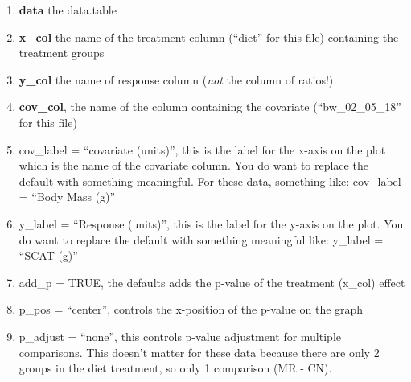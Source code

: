\documentclass[]{book}
\providecommand{\tightlist}{%
  \setlength{\itemsep}{0pt}\setlength{\parskip}{0pt}}
\begin{document}
\begin{enumerate}
\def\labelenumi{\arabic{enumi}.}
\tightlist
\item
  \textbf{data} the data.table
\item
  \textbf{x\_col} the name of the treatment column (``diet'' for this file) containing the treatment groups
\item
  \textbf{y\_col} the name of response column (\emph{not} the column of ratios!)
\item
  \textbf{cov\_col}, the name of the column containing the covariate (``bw\_02\_05\_18'' for this file)
\item
  cov\_label = ``covariate (units)'', this is the label for the x-axis on the plot which is the name of the covariate column. You do want to replace the default with something meaningful. For these data, something like: cov\_label = ``Body Mass (g)''
\item
  y\_label = ``Response (units)'', this is the label for the y-axis on the plot. You do want to replace the default with something meaningful like: y\_label = ``SCAT (g)''
\item
  add\_p = TRUE, the defaults adds the p-value of the treatment (x\_col) effect
\item
  p\_pos = ``center'', controls the x-position of the p-value on the graph
\item
  p\_adjust = ``none'', this controls p-value adjustment for multiple comparisons. This doesn't matter for these data because there are only 2 groups in the diet treatment, so only 1 comparison (MR - CN).
\end{enumerate}
\end{document}

